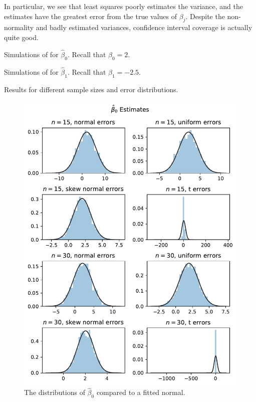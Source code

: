 \documentclass[letterpaper,11pt]{article}
\begin{document}
\begin{enumerate}
\begin{enumerate}
\begin{description}
      In particular, we see that least squares poorly estimates the variance,
      and the estimates have the greatest error from the true values of
      $\beta_j$. Despite the non-normality and badly estimated variances,
      confidence interval coverage is actually quite good.
    \end{description}
  \end{enumerate}

  \begin{table}
    \tiny
    \begin{subtable}{\textwidth}
      \centering
      
      \caption{Simulations of for $\hat{\beta}_0$. Recall that $\beta_0 = 2$.}
      \label{tab:p1_simulations_beta_0}
    \end{subtable}
    \begin{subtable}{\textwidth}
      \centering
      
      \caption{Simulations of for $\hat{\beta}_1$. Recall that
        $\beta_1 = -2.5$.}
      \label{tab:p1_simulations_beta_1}
    \end{subtable}
    \caption{Results for different sample sizes and error distributions.}
    \label{tab:p1_simulations}
  \end{table}

  \begin{figure}
    \centering
    \includegraphics{p1_beta_hat_0_distribution.pdf}
    \caption{The distributions of $\hat{\beta}_0$ compared to a fitted normal.}
    \label{fig:p1_beta_0_distribution}
  \end{figure}


\end{enumerate}
\end{document}
